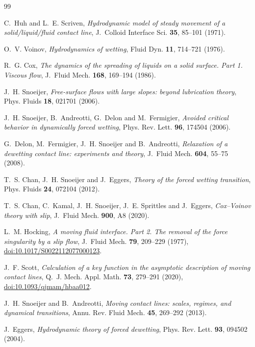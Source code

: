 \documentclass[11pt,a4paper]{article}
\begin{document}
\begin{thebibliography}{99}

C.~Huh and L.~E. Scriven,
\emph{Hydrodynamic model of steady movement of a solid/liquid/fluid contact
line}, J.~Colloid Interface Sci. \textbf{35}, 85--101 (1971).

O.~V. Voinov,
\emph{Hydrodynamics of wetting},
Fluid Dyn. \textbf{11}, 714--721 (1976).

R.~G. Cox,
\emph{The dynamics of the spreading of liquids on a solid surface. Part 1.
Viscous flow}, J.~Fluid Mech. \textbf{168}, 169--194 (1986).

J.~H. Snoeijer,
\emph{Free-surface flows with large slopes: beyond lubrication theory},
Phys. Fluids \textbf{18}, 021701 (2006).

J.~H. Snoeijer, B.~Andreotti, G.~Delon and M.~Fermigier,
\emph{Avoided critical behavior in dynamically forced wetting},
Phys. Rev. Lett. \textbf{96}, 174504 (2006).

G.~Delon, M.~Fermigier, J.~H. Snoeijer and B.~Andreotti,
\emph{Relaxation of a dewetting contact line: experiments and theory},
J.~Fluid Mech. \textbf{604}, 55--75 (2008).

T.~S. Chan, J.~H. Snoeijer and J.~Eggers,
\emph{Theory of the forced wetting transition},
Phys. Fluids \textbf{24}, 072104 (2012).

T.~S. Chan, C.~Kamal, J.~H. Snoeijer, J.~E. Sprittles and J.~Eggers,
\emph{Cox--Voinov theory with slip},
J.~Fluid Mech. \textbf{900}, A8 (2020).

L.~M. Hocking,
\emph{A moving fluid interface. Part 2. The removal of the force singularity
by a slip flow},
J.~Fluid Mech. \textbf{79}, 209--229 (1977),
\href{https://doi.org/10.1017/S0022112077000123}
{doi:10.1017/S0022112077000123}.

J.~F. Scott,
\emph{Calculation of a key function in the asymptotic description of moving
contact lines},
Q.~J. Mech. Appl. Math. \textbf{73}, 279--291 (2020),
\href{https://doi.org/10.1093/qjmam/hbaa012}
{doi:10.1093/qjmam/hbaa012}.

J.~H. Snoeijer and B.~Andreotti,
\emph{Moving contact lines: scales, regimes, and dynamical transitions},
Annu. Rev. Fluid Mech. \textbf{45}, 269--292 (2013).

J.~Eggers,
\emph{Hydrodynamic theory of forced dewetting},
Phys. Rev. Lett. \textbf{93}, 094502 (2004).


\end{thebibliography}
\end{document}

